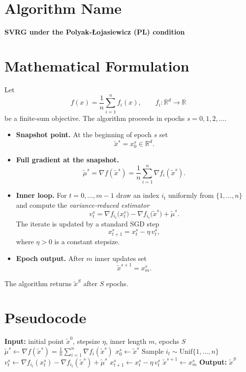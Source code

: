 \documentclass{article}
\begin{document}
\section*{Algorithm Name}
\textbf{SVRG under the Polyak‑\L{}ojasiewicz (PL) condition}

\section*{Mathematical Formulation}
Let 
\[
f(x)=\frac{1}{n}\sum_{i=1}^{n}f_i(x),\qquad 
f_i:\mathbb{R}^d\rightarrow\mathbb{R}
\]
be a finite‑sum objective.  
The algorithm proceeds in epochs $s=0,1,2,\dots$.
\begin{itemize}
    \item \textbf{Snapshot point.} At the beginning of epoch $s$ set
    \[
    \tilde{x}^{s}=x_{0}^{s}\in\mathbb{R}^{d}.
    \]
    \item \textbf{Full gradient at the snapshot.}
    \[
    \tilde{\mu}^{s}= \nabla f(\tilde{x}^{s})=\frac{1}{n}\sum_{i=1}^{n}\nabla f_i(\tilde{x}^{s}).
    \]
    \item \textbf{Inner loop.} For $t=0,\dots ,m-1$ draw an index $i_t$ uniformly
    from $\{1,\dots ,n\}$ and compute the \emph{variance‑reduced estimator}
    \[
    v_t^{s}= \nabla f_{i_t}\!\bigl(x_t^{s}\bigr)
            -\nabla f_{i_t}\!\bigl(\tilde{x}^{s}\bigr)+\tilde{\mu}^{s}.
    \]
    The iterate is updated by a standard SGD step
    \[
    x_{t+1}^{s}=x_{t}^{s}-\eta\,v_t^{s},
    \]
    where $\eta>0$ is a constant stepsize.
    \item \textbf{Epoch output.} After $m$ inner updates set
    \[
    \tilde{x}^{s+1}=x_{m}^{s}.
    \]
\end{itemize}
The algorithm returns $\tilde{x}^{S}$ after $S$ epochs.

\section*{Pseudocode}
\begin{algorithm}[H]
\caption{SVRG with PL condition}
\begin{algorithmic}[1]
\State \textbf{Input:} initial point $\tilde{x}^{0}$, stepsize $\eta$, inner length $m$, epochs $S$
    \State $\tilde{\mu}^{s}\gets \nabla f(\tilde{x}^{s})=\frac1n\sum_{i=1}^{n}\nabla f_i(\tilde{x}^{s})$
    \State $x_{0}^{s}\gets \tilde{x}^{s}$
        \State Sample $i_t\sim\text{Unif}\{1,\dots ,n\}$
        \State $v_t^{s}\gets \nabla f_{i_t}(x_t^{s})-\nabla f_{i_t}(\tilde{x}^{s})+\tilde{\mu}^{s}$
        \State $x_{t+1}^{s}\gets x_t^{s}-\eta\,v_t^{s}$
    \EndFor
    \State $\tilde{x}^{s+1}\gets x_{m}^{s}$
\EndFor
\State \textbf{Output:} $\tilde{x}^{S}$
\end{algorithmic}
\end{algorithm}
\end{document}
